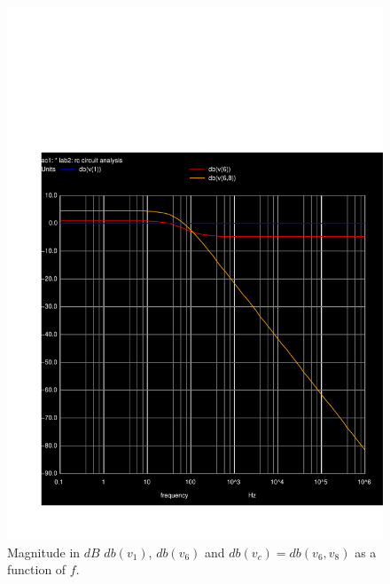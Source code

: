  \begin{figure}[h]
     \centering
         \includegraphics[scale = 0.55]{acm.pdf}
         \caption{Magnitude in $dB$ $db(v_1)$, $db(v_6)$ and $db(v_c)=db(v_6,v_8)$ as a function of $f$.}
     \label{acm}
 \end{figure}
 \vspace{5mm}

